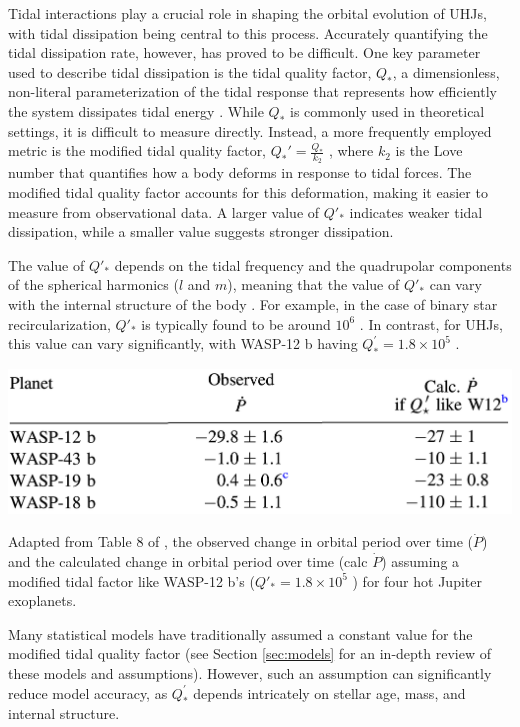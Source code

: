 \documentclass[oneside,12pt]{amsart}
\numberwithin{page}{section}
\begin{document}
Tidal interactions play a crucial role in shaping the orbital evolution of UHJs, with tidal dissipation being central to this process. Accurately quantifying the tidal dissipation rate, however, has proved to be difficult. One key parameter used to describe tidal dissipation is the tidal quality factor, $Q_*$, a dimensionless, non-literal parameterization of the tidal response that represents how efficiently the system dissipates tidal energy \citep{ogilvie2014tidal}. While $Q_*$ is commonly used in theoretical settings, it is difficult to measure directly. Instead, a more frequently employed metric is the modified tidal quality factor, $Q_*' = \frac{Q_*}{k_2}$ \citep{patel2022constraining}, where $k_2$ is the Love number that quantifies how a body deforms in response to tidal forces. The modified tidal quality factor accounts for this deformation, making it easier to measure from observational data. A larger value of $Q'_*$ indicates weaker tidal dissipation, while a smaller value suggests stronger dissipation.

The value of $Q'_*$ depends on the tidal frequency and the quadrupolar components of the spherical harmonics ($l$ and $m$), meaning that the value of $Q'_*$ can vary with the internal structure of the body \citep{ogilvie2014tidal}. For example, in the case of binary star recircularization, $Q'_*$ is typically found to be around $10^6$ \citep{ogilvie2007tidal}. In contrast, for UHJs, this value can vary significantly, with WASP-12 b having $Q^{'}_{*} = 1.8 \times 10^5$ \citep{yee2019orbit}.

\begin{table}[htbp]
    \centering
    \includegraphics[width=0.65\linewidth]{figs/adams_tbl8.png}
    \caption{Adapted from Table 8 of \citet{adams2024doomed}, the observed change in orbital period over time ($\dot{P}$) and the calculated change in orbital period over time (calc $\dot{P}$) assuming a modified tidal factor like WASP-12 b's ($Q'_* = 1.8 \times 10^5$ \citep{yee2019orbit}) for four hot Jupiter exoplanets.}
    \label{tab:adams-tbl8}
\end{table}

Many statistical models have traditionally assumed a constant value for the modified tidal quality factor (see Section \ref{sec:models} for an in-depth review of these models and assumptions). However, such an assumption can significantly reduce model accuracy, as $Q^{'}_{*}$ depends intricately on stellar age, mass, and internal structure.
\end{document}
